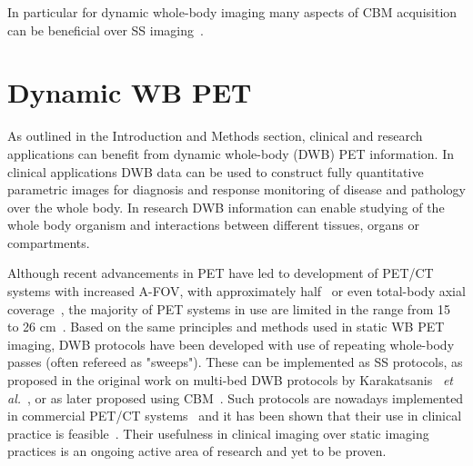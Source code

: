In particular for dynamic whole-body imaging many aspects of CBM acquisition can be beneficial over SS imaging~\cite{Karakatsanis2016a}.  

\section{Dynamic WB PET}
As outlined in the Introduction and Methods section, clinical and research applications can benefit from dynamic whole-body (DWB) PET information. In clinical applications DWB data can be used to construct fully quantitative parametric images for diagnosis and response monitoring of disease and pathology over the whole body. In research DWB information can enable studying of the whole body organism and interactions between different tissues, organs or compartments. 

Although recent advancements in PET have led to development of PET/CT systems with increased A-FOV, with approximately half~\cite{Karp2020,Siegel2020} or even total-body axial coverage~\cite{Cherry2018}, the majority of PET systems in use are limited in the range from 15 to 26 cm~\cite{Vandenberghe2020}. 
Based on the same principles and methods used in static WB PET imaging, DWB protocols have been developed with use of repeating whole-body passes (often refereed as "sweeps"). These can be implemented as SS protocols, as proposed in the original work on multi-bed DWB protocols by Karakatsanis ~\textit{et al.}~\cite{Karakatsanis2011,Karakatsanis2013}, or as later proposed using CBM~\cite{Karakatsanis2016a,Hu2020}. Such protocols are nowadays implemented in commercial PET/CT systems~\cite{Hu2020} and it has been shown that their use in clinical practice is feasible~\cite{Fahrni2019,Dias2020}.  Their usefulness in clinical imaging over static imaging practices is an ongoing active area of research and yet to be proven. 

